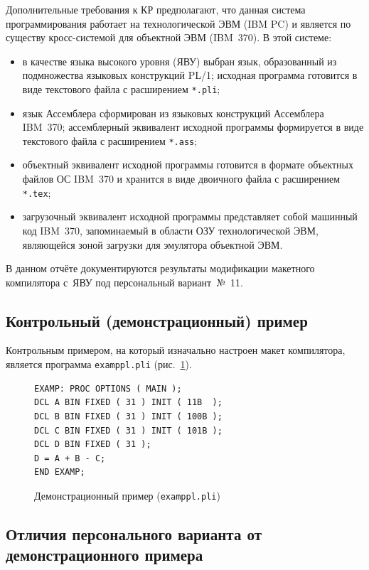 \documentclass[a4paper,14pt]{extarticle}
\begin{document}
Дополнительные требования к КР предполагают, что данная система программирования
работает на технологической ЭВМ (IBM PC) и является по существу кросс-системой для
объектной ЭВМ (IBM~370). В этой системе:
\begin{itemize}
  \item в качестве языка высокого уровня (ЯВУ) выбран язык, образованный из
        подмножества языковых конструкций PL/1; исходная программа готовится в виде
        текстового файла с расширением \texttt{*.pli};
  \item язык Ассемблера сформирован из языковых конструкций Ассемблера IBM~370;
        ассемблерный эквивалент исходной программы формируется в виде текстового
        файла с расширением \texttt{*.ass};
  \item объектный эквивалент исходной программы готовится в формате объектных файлов
        ОС IBM~370 и хранится в виде двоичного файла с расширением \texttt{*.tex};
  \item загрузочный эквивалент исходной программы представляет собой машинный код
        IBM~370, запоминаемый в области ОЗУ технологической ЭВМ, являющейся зоной
        загрузки для эмулятора объектной ЭВМ.
\end{itemize}

В данном отчёте документируются результаты модификации макетного компилятора с~ЯВУ
под персональный вариант~№~11.

\subsection*{Контрольный (демонстрационный) пример}

Контрольным примером, на который изначально настроен макет компилятора,
является программа \texttt{examppl.pli} (рис.~\ref{fig:demo}).

\begin{figure}[H]
\centering
\begin{lstlisting}[style=PLIstyle]
EXAMP: PROC OPTIONS ( MAIN );
DCL A BIN FIXED ( 31 ) INIT ( 11B  );
DCL B BIN FIXED ( 31 ) INIT ( 100B );
DCL C BIN FIXED ( 31 ) INIT ( 101B );
DCL D BIN FIXED ( 31 );
D = A + B - C;
END EXAMP;
\end{lstlisting}
\caption{Демонстрационный пример (\texttt{examppl.pli})}
\label{fig:demo}
\end{figure}

\subsection*{Отличия персонального варианта от демонстрационного примера}
\end{document}
